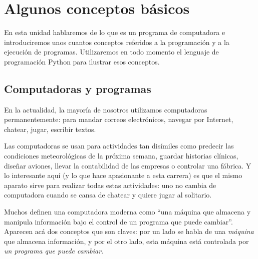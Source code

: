 
%

\chapter[Conceptos básicos]{Algunos conceptos básicos}
\label{chapter:conceptos}

En esta unidad hablaremos de lo que es un programa de
computadora e introduciremos unos cuantos conceptos referidos a la
programación y a la ejecución de programas. Utilizaremos en todo
momento el lenguaje de programación Python para ilustrar esos
conceptos.

\section{Computadoras y programas}

En la actualidad, la mayoría de nosotros utilizamos computadoras
permanentemente: para mandar correos electrónicos, navegar por Internet,
chatear, jugar, escribir textos.

Las computadoras se usan para actividades tan disímiles como predecir las
condiciones meteorológicas de la próxima semana, guardar historias clínicas,
diseñar aviones, llevar la contabilidad de las empresas o controlar una
fábrica. Y lo interesante aquí (y lo que hace apasionante a esta carrera) es
que el mismo aparato sirve para realizar todas estas actividades: uno no
cambia de computadora cuando se cansa de chatear y quiere jugar al solitario.

Muchos definen una computadora moderna como ``una máquina que
almacena y manipula información bajo el control de un programa que
puede cambiar''. Aparecen acá dos conceptos que son claves: por un
lado se habla de una {\it máquina} que almacena información, y por
el otro lado, esta máquina está controlada por {\it un programa
que puede cambiar}.

